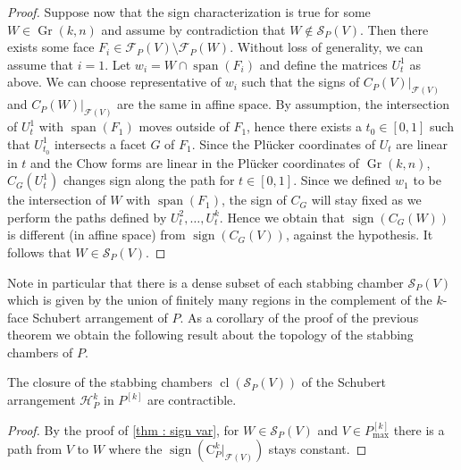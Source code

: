 \documentclass[english]{ourlematema}
\DeclareMathOperator{\Gr}{Gr}
\DeclareMathOperator{\spanv}{span}
\DeclareMathOperator{\sign}{sign}
\DeclareMathOperator{\cl}{cl}
\newcommand{\mF}{\mathcal{F}}
\newcommand{\mS}{\mathcal{S}}
\newcommand{\Pk}{P^{[k]}}
\newcommand{\Pkmax}{P^{[k]}_{\max}}
\newcommand{\HPk}{\mathcal{H}_P^k}
\newcommand{\CPk}{\mathrm{C}_P^k}
\begin{document}
\begin{proof}
    \vspace{5pt}
    Suppose now that the sign characterization is true for some $W\in \Gr(k,n)$ and assume by contradiction that $W\not\in \mS_P(V)$. Then there exists some face $F_i\in \mF_P(V)\setminus \mF_P(W)$. Without loss of generality, we can assume that $i=1$. Let $w_i = W\cap \spanv(F_i)$ and define the matrices $U_t^1$ as above. 
    We can choose representative of $w_i$ such that the signs of $C_P(V)|_{\mF(V)}$ and $C_P(W)|_{\mF(V)}$ are the same in affine space.
    By assumption, the intersection of $U_t^1$ with $\spanv(F_1)$ moves outside of $F_1$, hence there exists a $t_0\in [0,1]$ such that $U^1_{t_0}$ intersects a facet $G$ of $F_1$. Since the Pl\"ucker coordinates of $U_t$ are linear in $t$ and the Chow forms are linear in the Pl\"ucker coordinates of $\Gr(k,n)$, $C_G(U^1_t)$ changes sign along the path for $t\in [0,1]$. Since we defined $w_1$ to be the intersection of $W$ with $\spanv(F_1)$, the sign of $C_G$ will stay fixed as we perform the paths defined by $U^2_t, \ldots, U^k_t$. Hence we obtain that $\sign(C_G(W))$ is different (in affine space) from $\sign(C_G(V))$, against the hypothesis. It follows that $W\in \mS_P(V)$.
\end{proof}

Note in particular that there is a dense subset of each stabbing chamber $\mS_P(V)$ which is given by the union of finitely many regions in the complement of the $k$-face Schubert arrangement of $P$.
As a corollary of the proof of the previous theorem we obtain the following result about the topology of the stabbing chambers of $P$.

\begin{cor}
    The closure of the stabbing chambers $\cl(\mS_P(V))$ of the Schubert arrangement $\HPk$ in $\Pk$ are contractible.
\end{cor}
\begin{proof}
 By the proof of \ref{thm : sign var}, for $W \in \mS_P(V)$ and $V\in \Pkmax$ there is a path from $V$ to $W$ where the $\sign(\CPk|_{\mF(V)})$ stays constant. 
\end{proof}
\end{document}
